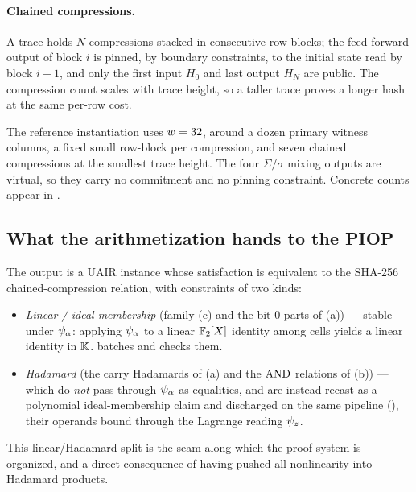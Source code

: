\paragraph{Chained compressions.} A trace holds $N$ compressions stacked in
consecutive row-blocks; the feed-forward output of block $i$ is pinned, by
boundary constraints, to the initial state read by block $i+1$, and only the
first input $H_0$ and last output $H_N$ are public. The compression count scales
with trace height, so a taller trace proves a longer hash at the same per-row
cost.

\begin{remark}
\label{rem:deployed-shape}
The reference instantiation uses $w = 32$, around a dozen primary witness
columns, a fixed small row-block per compression, and seven chained
compressions at the smallest trace height. The four $\Sigma/\sigma$ mixing
outputs are virtual, so they carry no commitment and no pinning constraint.
Concrete counts appear in .
\end{remark}

\subsection{What the arithmetization hands to the PIOP}
\label{sec:arith-handoff}

The output is a UAIR instance whose satisfaction is equivalent to the SHA-256
chained-compression relation, with constraints of two kinds:
\begin{itemize}[leftmargin=2em]
  \item \emph{Linear / ideal-membership} (family (c) and the bit-$0$ parts of
    (a)) --- stable under $\psi_{\alpha}$: applying $\psi_{\alpha}$ to a linear $\mathbb{F}_2[X]$
    identity among cells yields a linear identity in $\mathbb{K}$. 
    batches and checks them.
  \item \emph{Hadamard} (the carry Hadamards of (a) and the $\operatorname{AND}$ relations of
    (b)) --- which do \emph{not} pass through $\psi_{\alpha}$ as equalities, and are
    instead recast as a polynomial ideal-membership claim and discharged on the
    same pipeline (), their operands bound through the
    Lagrange reading $\psi_{z}$.
\end{itemize}
This linear/Hadamard split is the seam along which the proof system is
organized, and a direct consequence of having pushed all nonlinearity into
Hadamard products.
